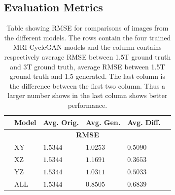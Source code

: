 \documentclass[12pt, fleqn, titlepage]{article}
\newcommand{\1}[1]{\mathds{1}\left[#1\right]}
\begin{document}
\subsection{Evaluation Metrics}
\begin{table}[H]
	\begin{center}
		\begin{tabular}{l l l l l l}
			\toprule
			& \textbf{Model} & \textbf{Avg. Orig.} & \textbf{Avg. Gen.} & \textbf{Avg. Diff.} & \\ \midrule
			&                        \multicolumn{4}{c}{\textbf{RMSE}}                          & \\
			&XY                & $1.5344$            & $1.0253$           & $0.5090$            & \\
			&XZ                & $1.5344$            & $1.1691$           & $0.3653$            & \\
			&YZ                & $1.5344$            & $1.0311$           & $0.5033$            & \\
			&ALL               & $1.5344$            & $0.8505$           & $0.6839$            & \\
			 \bottomrule
		\end{tabular}
		\caption{Table showing RMSE for comparisons of images from the different models. The rows contain the four trained MRI CycleGAN models and the column contains respectively average RMSE between 1.5T ground truth and 3T ground truth, average RMSE between 1.5T ground truth and 1.5 generated. The last column is the difference between the first two column. Thus a larger number shows in the last column shows better performance.}
		\label{tab:metrics_rmse}
	\end{center}
\end{table}
\end{document}
